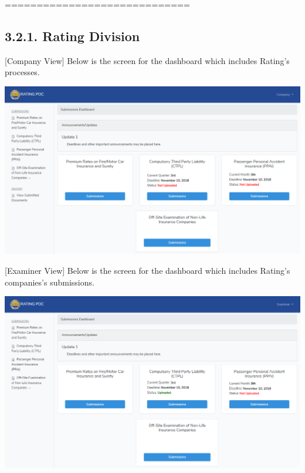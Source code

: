 \documentclass{article}
\begin{document}
\mdhr{}%

\noindent{}=============================%

\subsection{3.2.\hspace*{0.5em}1.  Rating Division}\label{sec-1-rating-division}%

\noindent{}[Company View] Below is the screen for the dashboard
which includes Rating’s processes.%

\includegraphics[keepaspectratio=true]{up-ic-screens/image101}{}%

[Examiner View] Below is the screen for the dashboard
which includes Rating’s companies’s submissions.%

\includegraphics[keepaspectratio=true]{up-ic-screens/image61}{}%
\end{document}
